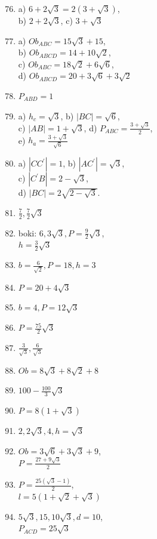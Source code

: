 \documentclass[10pt]{article}
\begin{document}
\begin{enumerate}
  \setcounter{enumi}{75}
  \item a) \(6+2 \sqrt{3}=2(3+\sqrt{3})\),\\
b) \(2+2 \sqrt{3}\), c) \(3+\sqrt{3}\)
  \item a) \(O b_{A B C}=15 \sqrt{3}+15\),\\
b) \(O b_{A B C D}=14+10 \sqrt{2}\),\\
c) \(O b_{A B C}=18 \sqrt{2}+6 \sqrt{6}\),\\
d) \(O b_{A B C D}=20+3 \sqrt{6}+3 \sqrt{2}\)
  \item \(P_{A B D}=1\)
  \item a) \(h_{c}=\sqrt{3}\), b) \(|B C|=\sqrt{6}\),\\
c) \(|A B|=1+\sqrt{3}\), d) \(P_{A B C}=\frac{3+\sqrt{3}}{2}\),\\
e) \(h_{a}=\frac{3+\sqrt{3}}{\sqrt{6}}\)
  \item a) \(\left|C C^{\prime}\right|=1\), b) \(\left|A C^{\prime}\right|=\sqrt{3}\),\\
c) \(\left|C^{\prime} B\right|=2-\sqrt{3}\),\\
d) \(|B C|=2 \sqrt{2-\sqrt{3}}\).
  \item \(\frac{7}{2}, \frac{7}{2} \sqrt{3}\)
  \item boki: \(6,3 \sqrt{3}, P=\frac{9}{2} \sqrt{3}\),\\
\(h=\frac{3}{2} \sqrt{3}\)
  \item \(b=\frac{6}{\sqrt{2}}, P=18, h=3\)
  \item \(P=20+4 \sqrt{3}\)
  \item \(b=4, P=12 \sqrt{3}\)
  \item \(P=\frac{75}{2} \sqrt{3}\)
  \item \(\frac{3}{\sqrt{3}}, \frac{6}{\sqrt{3}}\)
  \item \(O b=8 \sqrt{3}+8 \sqrt{2}+8\)
  \item \(100-\frac{100}{3} \sqrt{3}\)
  \item \(P=8(1+\sqrt{3})\)
  \item \(2,2 \sqrt{3}, 4, h=\sqrt{3}\)
  \item \(O b=3 \sqrt{6}+3 \sqrt{3}+9\),\\
\(P=\frac{27+9 \sqrt{3}}{2}\)
  \item \(P=\frac{25(\sqrt{3}-1)}{2}\),\\
\(l=5(1+\sqrt{2}+\sqrt{3})\)
  \item \(5 \sqrt{3}, 15,10 \sqrt{3}, d=10\),\\
\(P_{A C D}=25 \sqrt{3}\)\\

\end{enumerate}
\end{document}
